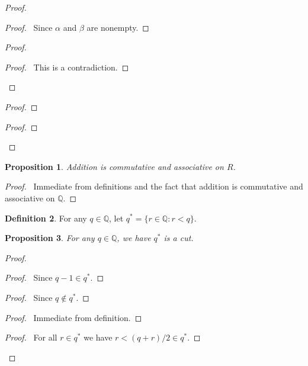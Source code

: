\documentclass{book}
\let\qed\relax
\newtheorem{prop}{Proposition}[chapter]
\theoremstyle{definition}
\newtheorem{df}[prop]{Definition}
\begin{document}
\begin{proof}
\pf
{}
\begin{proof}
	\pf\ Since $\alpha$ and $\beta$ are nonempty.
\end{proof}
\begin{proof}
	\qedstep
	\begin{proof}
		\pf\ This is a contradiction.
	\end{proof}
\end{proof}
\begin{proof}
\end{proof}
\begin{proof}
\end{proof}
\qed
\end{proof}

\begin{prop}
Addition is commutative and associative on $R$.
\end{prop}

\begin{proof}
\pf\ Immediate from definitions and the fact that addition is commutative and associative on $\mathbb{Q}$. \qed
\end{proof}

\begin{df}
For any $q \in \mathbb{Q}$, let $q^* = \{ r \in \mathbb{Q} : r < q \}$.
\end{df}

\begin{prop}
For any $q \in \mathbb{Q}$, we have $q^*$ is a cut.
\end{prop}

\begin{proof}
\pf
{}
\begin{proof}
\pf\ Since $q - 1 \in q^*$.
\end{proof}
\begin{proof}
\pf\ Since $q \notin q^*$.
\end{proof}
\begin{proof}
\pf\ Immediate from definition.
\end{proof}
\begin{proof}
\pf\ For all $r \in q^*$ we have $r < (q+r)/2 \in q^*$.
\end{proof}
\qed
\end{proof}
\end{document}
